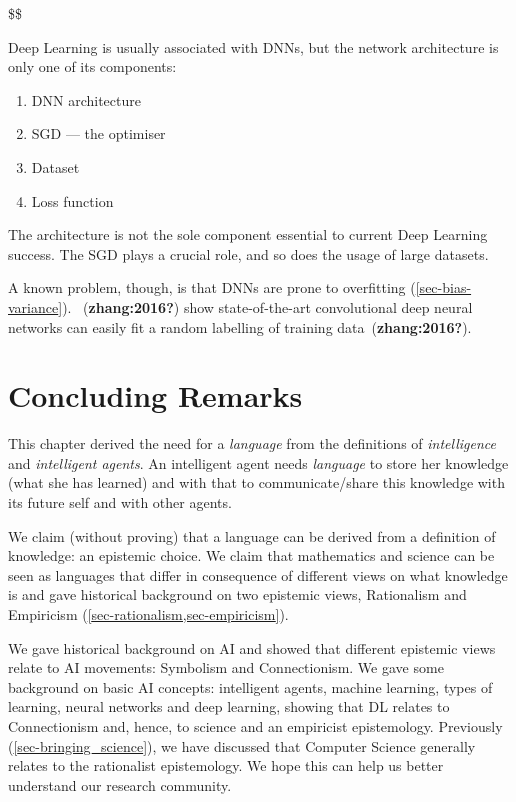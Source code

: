 \documentclass[
  letterpaper,
  DIV=11,
  numbers=noendperiod,
  oneside]{scrreprt}
\begin{document}
\$\$

Deep Learning is usually associated with {DNNs}, but the network
architecture is only one of its components:

\begin{enumerate}
\def\labelenumi{\arabic{enumi}.}
\item
  DNN architecture
\item
  {SGD} --- the optimiser
\item
  Dataset
\item
  Loss function
\end{enumerate}

The architecture is not the sole component essential to current Deep
Learning success. The {SGD} plays a crucial role, and so does the usage
of large datasets.

A known problem, though, is that DNNs are prone to overfitting
(\protect\hyperlink{sec-bias-variance}{{[}sec-bias-variance{]}}).
~(\textbf{zhang:2016?}) show state-of-the-art convolutional deep neural
networks can easily fit a random labelling of training
data~(\textbf{zhang:2016?}).

\hypertarget{concluding-remarks}{%
\section{Concluding Remarks}\label{concluding-remarks}}

This chapter derived the need for a \emph{language} from the definitions
of \emph{intelligence} and \emph{intelligent agents}. An intelligent
agent needs \emph{language} to store her knowledge (what she has
learned) and with that to communicate/share this knowledge with its
future self and with other agents.

We claim (without proving) that a language can be derived from a
definition of knowledge: an epistemic choice. We claim that mathematics
and science can be seen as languages that differ in consequence of
different views on what knowledge is and gave historical background on
two epistemic views, Rationalism and Empiricism
(\protect\hyperlink{sec-rationalismux2csec-empiricism}{{[}sec-rationalism,sec-empiricism{]}}).

We gave historical background on {AI} and showed that different
epistemic views relate to {AI} movements: Symbolism and Connectionism.
We gave some background on basic {AI} concepts: intelligent agents,
machine learning, types of learning, neural networks and deep learning,
showing that {DL} relates to Connectionism and, hence, to science and an
empiricist epistemology. Previously
(\protect\hyperlink{sec-bringing_science}{{[}sec-bringing\_science{]}}),
we have discussed that Computer Science generally relates to the
rationalist epistemology. We hope this can help us better understand our
research community.
\end{document}
